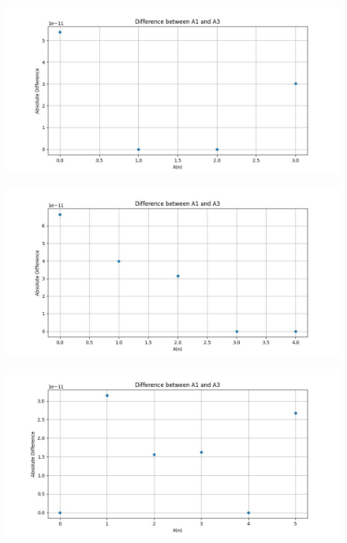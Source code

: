 \documentclass{article}
\begin{document}
\begin{figure}
    \centering
    \includegraphics[width=1\linewidth]{h2_plot_4.jpg}
    \label{fig:enter-label}
\end{figure}

\begin{figure}
    \centering
    \includegraphics[width=1\linewidth]{h2_plot_5.jpg}
    \label{fig:enter-label}
\end{figure}

\begin{figure}
    \centering
    \includegraphics[width=1\linewidth]{h2_plot_6.jpg}
    \label{fig:enter-label}
\end{figure}
\end{document}
